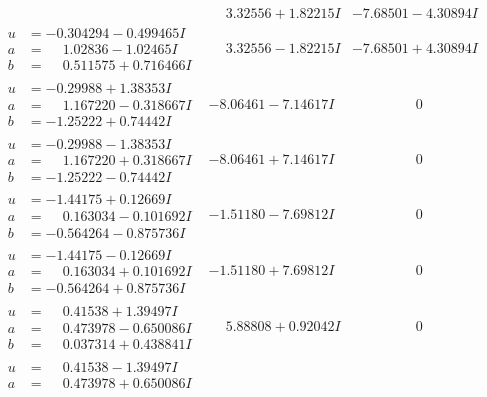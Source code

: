 \documentclass[1p]{elsarticle_modified}
\theoremstyle{definition}
\begin{document}
$$\begin{array}{c|c|c}
 & \phantom{-}3.32556 + 1.82215 I & -7.68501 - 4.30894 I \\ \hline\begin{aligned}
u &= -0.304294 - 0.499465 I \\
a &= \phantom{-}1.02836 - 1.02465 I \\
b &= \phantom{-}0.511575 + 0.716466 I\end{aligned}
 & \phantom{-}3.32556 - 1.82215 I & -7.68501 + 4.30894 I \\ \hline\begin{aligned}
u &= -0.29988 + 1.38353 I \\
a &= \phantom{-}1.167220 - 0.318667 I \\
b &= -1.25222 + 0.74442 I\end{aligned}
 & -8.06461 - 7.14617 I & \phantom{-0.000000 } 0 \\ \hline\begin{aligned}
u &= -0.29988 - 1.38353 I \\
a &= \phantom{-}1.167220 + 0.318667 I \\
b &= -1.25222 - 0.74442 I\end{aligned}
 & -8.06461 + 7.14617 I & \phantom{-0.000000 } 0 \\ \hline\begin{aligned}
u &= -1.44175 + 0.12669 I \\
a &= \phantom{-}0.163034 - 0.101692 I \\
b &= -0.564264 - 0.875736 I\end{aligned}
 & -1.51180 - 7.69812 I & \phantom{-0.000000 } 0 \\ \hline\begin{aligned}
u &= -1.44175 - 0.12669 I \\
a &= \phantom{-}0.163034 + 0.101692 I \\
b &= -0.564264 + 0.875736 I\end{aligned}
 & -1.51180 + 7.69812 I & \phantom{-0.000000 } 0 \\ \hline\begin{aligned}
u &= \phantom{-}0.41538 + 1.39497 I \\
a &= \phantom{-}0.473978 - 0.650086 I \\
b &= \phantom{-}0.037314 + 0.438841 I\end{aligned}
 & \phantom{-}5.88808 + 0.92042 I & \phantom{-0.000000 } 0 \\ \hline\begin{aligned}
u &= \phantom{-}0.41538 - 1.39497 I \\
a &= \phantom{-}0.473978 + 0.650086 I \\

\end{aligned}
\end{array}$$
\end{document}
